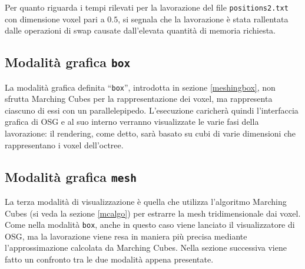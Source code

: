 Per quanto riguarda i tempi rilevati per la lavorazione del file \texttt{positions2.txt} con dimensione voxel pari a $0.5$, si segnala che la lavorazione è stata rallentata dalle operazioni di swap causate dall'elevata quantità di memoria richiesta.

\subsection{Modalità grafica \texttt{box}}
La modalità grafica definita ``\texttt{box}'', introdotta in sezione \ref{meshingbox}, non sfrutta  Marching Cubes per la rappresentazione dei voxel, ma rappresenta ciascuno di essi con un parallelepipedo. L'esecuzione caricherà quindi l'interfaccia grafica di OSG e al suo interno verranno visualizzate le varie fasi della lavorazione: il rendering, come detto, sarà basato su cubi di varie dimensioni che rappresentano i voxel dell'octree.

\subsection{Modalità grafica \texttt{mesh}}
La terza modalità di visualizzazione è quella che utilizza l'algoritmo Marching Cubes (si veda la sezione \ref{mcalgo}) per estrarre la mesh tridimensionale dai voxel. Come nella modalità \texttt{box}, anche in questo caso viene lanciato il visualizzatore di OSG, ma la lavorazione viene resa in maniera più precisa mediante l'approssimazione calcolata da Marching Cubes. Nella sezione successiva viene fatto un confronto tra le due modalità appena presentate.

